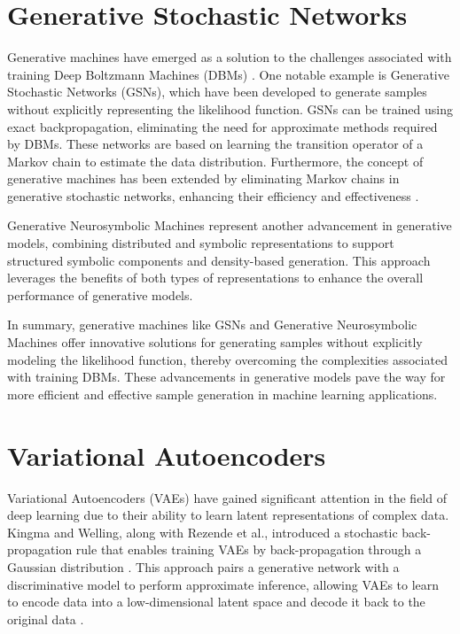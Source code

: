 \section*{Generative Stochastic Networks}

Generative machines have emerged as a solution to the challenges associated with training Deep Boltzmann Machines (DBMs) \citep{10.1093/imaiai/iaw003}. One notable example is Generative Stochastic Networks (GSNs), which have been developed to generate samples without explicitly representing the likelihood function. GSNs can be trained using exact backpropagation, eliminating the need for approximate methods required by DBMs. These networks are based on learning the transition operator of a Markov chain to estimate the data distribution. Furthermore, the concept of generative machines has been extended by eliminating Markov chains in generative stochastic networks, enhancing their efficiency and effectiveness \citep{10.48550/arxiv.2302.09465}.

Generative Neurosymbolic Machines represent another advancement in generative models, combining distributed and symbolic representations to support structured symbolic components and density-based generation. This approach leverages the benefits of both types of representations to enhance the overall performance of generative models.

In summary, generative machines like GSNs and Generative Neurosymbolic Machines offer innovative solutions for generating samples without explicitly modeling the likelihood function, thereby overcoming the complexities associated with training DBMs. These advancements in generative models pave the way for more efficient and effective sample generation in machine learning applications.



\section*{Variational Autoencoders}


Variational Autoencoders (VAEs) have gained significant attention in the field of deep learning due to their ability to learn latent representations of complex data. Kingma and Welling, along with Rezende et al., introduced a stochastic back-propagation rule that enables training VAEs by back-propagation through a Gaussian distribution \citep{10.48550/arxiv.1909.13062}. This approach pairs a generative network with a discriminative model to perform approximate inference, allowing VAEs to learn to encode data into a low-dimensional latent space and decode it back to the original data \citep{10.3390/bioengineering10101209}.

